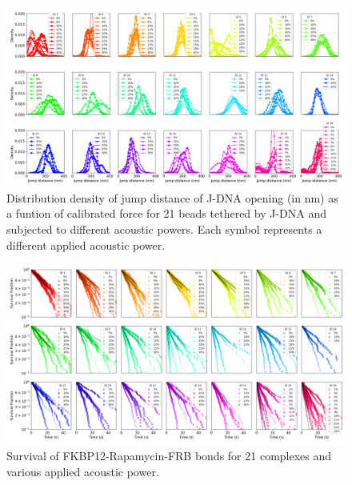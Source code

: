 \documentclass{biophys-new}
\begin{document}
\begin{figure}
	\centering
	\centerline {\includegraphics[width=1\linewidth]{Figures/multihistodzjump_Rapa.png}}
	\caption{Distribution density of jump distance of J-DNA opening (in nm) as a funtion of calibrated force for 21 beads tethered by J-DNA and subjected to different acoustic powers. Each symbol represents a different applied acoustic power.}
	\label{fig:JumpDistributions}	
\end{figure}



\begin{figure}
	\centering
	\centerline {\includegraphics[width=1\linewidth]{Figures/multisurvival2Bis_Rapa.png}}
	\caption{Survival of FKBP12-Rapamycin-FRB bonds for 21 complexes and various applied acoustic power.}
	\label{fig:MultiSurvival}	
\end{figure}
\end{document}
